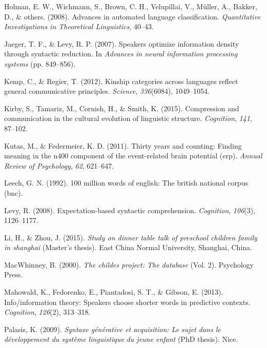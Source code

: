 \documentclass[man,floatsintext]{apa6}
\begin{document}
\leavevmode\hypertarget{ref-holman2008}{}%
Holman, E. W., Wichmann, S., Brown, C. H., Velupillai, V., Müller, A., Bakker, D., \& others. (2008). Advances in automated language classification. \emph{Quantitative Investigations in Theoretical Linguistics}, 40--43.

\leavevmode\hypertarget{ref-jaeger2007}{}%
Jaeger, T. F., \& Levy, R. P. (2007). Speakers optimize information density through syntactic reduction. In \emph{Advances in neural information processing systems} (pp. 849--856).

\leavevmode\hypertarget{ref-kemp2012kinship}{}%
Kemp, C., \& Regier, T. (2012). Kinship categories across languages reflect general communicative principles. \emph{Science}, \emph{336}(6084), 1049--1054.

\leavevmode\hypertarget{ref-kirby2015compression}{}%
Kirby, S., Tamariz, M., Cornish, H., \& Smith, K. (2015). Compression and communication in the cultural evolution of linguistic structure. \emph{Cognition}, \emph{141}, 87--102.

\leavevmode\hypertarget{ref-kutas2011}{}%
Kutas, M., \& Federmeier, K. D. (2011). Thirty years and counting: Finding meaning in the n400 component of the event-related brain potential (erp). \emph{Annual Review of Psychology}, \emph{62}, 621--647.

\leavevmode\hypertarget{ref-leech1992}{}%
Leech, G. N. (1992). 100 million words of english: The british national corpus (bnc).

\leavevmode\hypertarget{ref-levy2008}{}%
Levy, R. (2008). Expectation-based syntactic comprehension. \emph{Cognition}, \emph{106}(3), 1126--1177.

\leavevmode\hypertarget{ref-li2015}{}%
Li, H., \& Zhou, J. (2015). \emph{Study on dinner table talk of preschool children family in shanghai} (Master's thesis). East China Normal University, Shanghai, China.

\leavevmode\hypertarget{ref-macwhinney2000}{}%
MacWhinney, B. (2000). \emph{The childes project: The database} (Vol. 2). Psychology Press.

\leavevmode\hypertarget{ref-mahowald2013}{}%
Mahowald, K., Fedorenko, E., Piantadosi, S. T., \& Gibson, E. (2013). Info/information theory: Speakers choose shorter words in predictive contexts. \emph{Cognition}, \emph{126}(2), 313--318.

\leavevmode\hypertarget{ref-palasis2009}{}%
Palasis, K. (2009). \emph{Syntaxe générative et acquisition: Le sujet dans le développement du système linguistique du jeune enfant} (PhD thesis). Nice.
\end{document}
